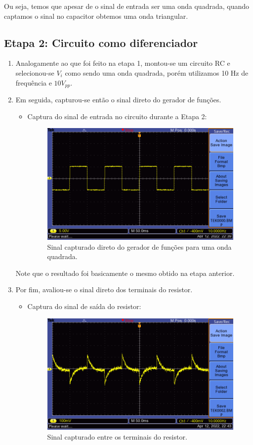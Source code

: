 \documentclass[letterpaper, 12pt]{article}
\begin{document}
\begin{enumerate}
    Ou seja, temos que apesar de o sinal de entrada ser uma onda quadrada, quando captamos o sinal no capacitor obtemos uma onda triangular.
\end{enumerate}

\subsection{Etapa 2: Circuito como diferenciador}\label{Etapa 2}
\begin{enumerate}
    \item Analogamente ao que foi feito na etapa 1, montou-se um circuito RC e selecionou-se $V_{i}$ como sendo uma onda quadrada, porém utilizamos 10 Hz de frequência e $10V_{pp}$.
    
    \item Em seguida, capturou-se então o sinal direto do gerador de funções. 
    \begin{itemize}
        \item Captura do sinal de entrada no circuito durante a Etapa 2:
        \begin{figure}[h]
            \centering
            \includegraphics[width=0.5\linewidth]{figures/Gerador de funções.png}
             \caption{Sinal capturado direto do gerador de funções para uma onda quadrada.}
            \label{Sinal - Gerador de funções 2}
        \end{figure}
    \end{itemize}
    
    Note que o resultado foi basicamente o mesmo obtido na etapa anterior.
    
    \item Por fim, avaliou-se o sinal direto dos terminais do resistor.
    \begin{itemize}
        \item Captura do sinal de saída do resistor:
        \begin{figure}[h]
            \centering
            \includegraphics[width=0.5\linewidth]{figures/Sinal-Resistor.png}
            \caption{Sinal capturado entre os terminais do resistor.}
            \label{Sinal - Resistor}
        \end{figure}
    \end{itemize}
    

\end{enumerate}
\end{document}
